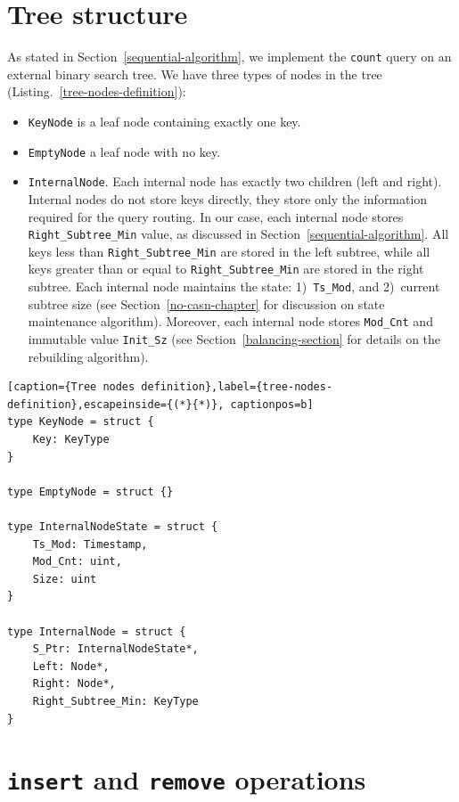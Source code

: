 \documentclass[times, dvipsnames,%
               languages={russian,english} %
              ]{itmo-student-thesis}
\begin{document}
\section{Tree structure}

As stated in Section~\ref{sequential-algorithm}, we implement the \texttt{count} query on an external binary search tree. We have three types of nodes in the tree (Listing.~\ref{tree-nodes-definition}):

\begin{itemize}
    \item \texttt{KeyNode} is a leaf node containing exactly one key.
    
    \item \texttt{EmptyNode} a leaf node with no key. 
    
    \item \texttt{InternalNode}. Each internal node has exactly two children (left and right). Internal nodes do not store keys directly, they store only the information required for the query routing. In our case, each internal node stores \texttt{Right\_Subtree\_Min} value, as discussed in Section~\ref{sequential-algorithm}. All keys less than \texttt{Right\_Subtree\_Min} are stored in the left subtree, while all keys greater than or equal to \texttt{Right\_Subtree\_Min} are stored in the right subtree. Each internal node maintains the state: 1)~\texttt{Ts\_Mod}, and 2)~current subtree size (see Section~\ref{no-casn-chapter} for discussion on state maintenance algorithm). Moreover, each internal node stores \texttt{Mod\_Cnt} and immutable value \texttt{Init\_Sz} (see Section~\ref{balancing-section} for details on the rebuilding algorithm).
\end{itemize}

\renewcommand{\lstlistingname}{Listing}
\begin{lstlisting}[caption={Tree nodes definition},label={tree-nodes-definition},escapeinside={(*}{*)}, captionpos=b]
type KeyNode = struct {
    Key: KeyType
}

type EmptyNode = struct {}

type InternalNodeState = struct {
    Ts_Mod: Timestamp,
    Mod_Cnt: uint,
    Size: uint
}

type InternalNode = struct {
    S_Ptr: InternalNodeState*,
    Left: Node*,
    Right: Node*,
    Right_Subtree_Min: KeyType
}
\end{lstlisting}

\section{\texttt{insert} and \texttt{remove} operations}
\label{executing-insert-remove}
\end{document}

